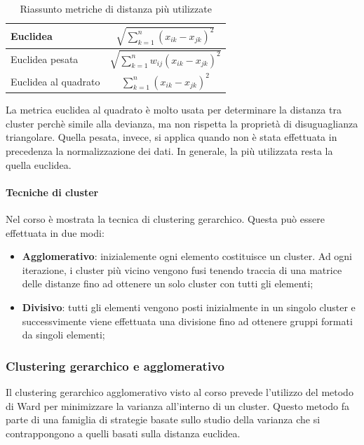 \documentclass{article}
\begin{document}
\begin{table}
  \begin{center}
    \begin{tabular}{ |l|c| } 
      \hline
      Euclidea & $\sqrt{\sum_{k=1}^{n}(x_{ik} - x_{jk})^2}$ \\ [1ex]
      \hline
      Euclidea pesata & $\sqrt{\sum_{k=1}^{n}w_{ij}(x_{ik} - x_{jk})^2}$ \\ [1ex]
      \hline
      Euclidea al quadrato & $\sum_{k=1}^{n}(x_{ik} - x_{jk})^2$ \\
      \hline 
    \end{tabular}
    \caption{Riassunto metriche di distanza più utilizzate}
    \label{tab:distance_metrics}
  \end{center}
\end{table}

La metrica euclidea al quadrato è molto usata per determinare la distanza tra cluster perchè
simile alla devianza, ma non rispetta la proprietà di disuguaglianza triangolare. 
Quella pesata, invece, si applica quando non è stata effettuata in precedenza la 
normalizzazione dei dati. In generale, la più utilizzata resta la quella euclidea.

\paragraph{Tecniche di cluster} Nel corso è mostrata la tecnica di clustering gerarchico. 
Questa può essere effettuata in due modi:
\begin{itemize}
  \item \textbf{Agglomerativo}: inizialemente ogni elemento costituisce un cluster. Ad ogni
    iterazione, i cluster più vicino vengono fusi tenendo traccia di una matrice delle 
    distanze fino ad ottenere un solo cluster con tutti gli elementi;
  \item \textbf{Divisivo}: tutti gli elementi vengono posti inizialmente in un singolo 
    cluster e successvimente viene effettuata una divisione fino ad ottenere gruppi 
    formati da singoli elementi;
\end{itemize}

\subsubsection{Clustering gerarchico e agglomerativo}
Il clustering gerarchico agglomerativo visto al corso prevede l'utilizzo del metodo di Ward 
per minimizzare la varianza all'interno di un cluster. Questo metodo fa parte di una famiglia
di strategie basate sullo studio della varianza che si contrappongono a quelli basati sulla
distanza euclidea.
\end{document}
